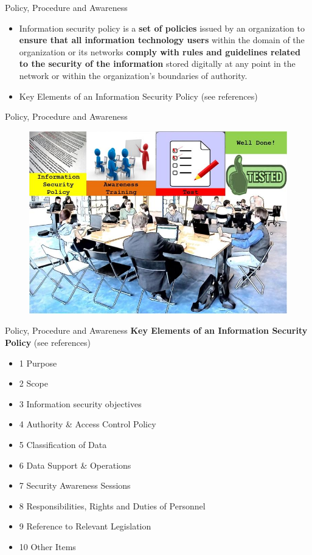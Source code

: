 \documentclass[pdf]{beamer}
\begin{document}
\begin{frame}{Policy, Procedure and Awareness}
\begin{itemize}
\item
Information security policy is a \textbf{set of policies }issued by an organization to \textbf{ensure that all information technology users} within the domain of the organization or its networks \textbf{comply with rules and guidelines related to the security of the information} stored digitally at any point in the network or within the organization's boundaries of authority. 

\item
Key Elements of an Information Security Policy (see references)

\end{itemize}
\end{frame}



\begin{frame}{Policy, Procedure and Awareness}
\begin{figure}[t]
\centering
\includegraphics[scale=0.5]{Images/060614_1305_KeyElements12}
\end{figure}
\end{frame}



\begin{frame}{Policy, Procedure and Awareness}
\textbf{Key Elements of an Information Security Policy} (see references)
\begin{itemize}
\item
1 Purpose
\item
2 Scope
\item
3 Information security objectives
\item
4 Authority \& Access Control Policy
\item
5 Classification of Data
\item
6 Data Support \& Operations
\item
7 Security Awareness Sessions
\item
8 Responsibilities, Rights and Duties of Personnel
\item
9 Reference to Relevant Legislation
\item
10 Other Items
\end{itemize}
\end{frame}
\end{document}
